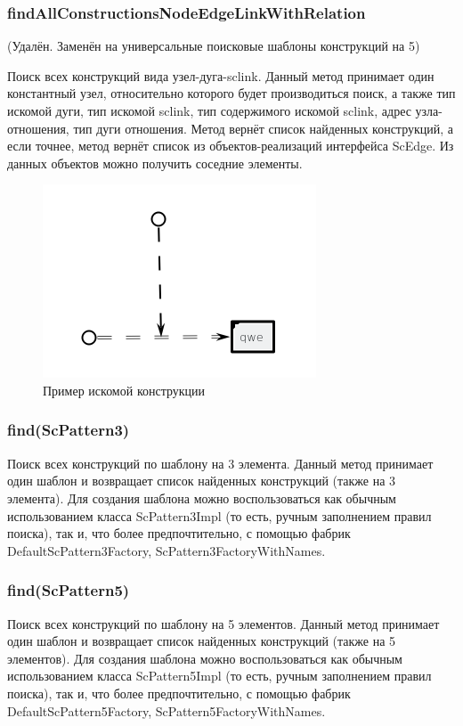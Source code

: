 \subsubsection {findAllConstructionsNodeEdgeLinkWithRelation} (Удалён. Заменён на универсальные поисковые шаблоны конструкций на 5)

Поиск всех конструкций вида узел-дуга-sclink. Данный метод принимает один константный узел, относительно которого будет производиться поиск, а также тип искомой дуги, тип искомой sclink, тип содержимого искомой sclink, адрес узла-отношения, тип дуги отношения. Метод вернёт список найденных конструкций, а если точнее, метод вернёт список из объектов-реализаций интерфейса ScEdge. Из данных объектов можно получить соседние элементы. 
\begin{figure}[H]
    \centering
    \includegraphics{images/sc-context/node-edge-link-with-rel.png}
    \caption{Пример искомой конструкции}
    \label{json_ex}
\end{figure}

\subsubsection{find(ScPattern3)} 

Поиск всех конструкций по шаблону на 3 элемента. Данный метод принимает один шаблон и возвращает список найденных конструкций (также на 3 элемента). Для создания шаблона можно воспользоваться как обычным использованием класса ScPattern3Impl (то есть, ручным заполнением правил поиска), так и, что более предпочтительно, с помощью фабрик DefaultScPattern3Factory, ScPattern3FactoryWithNames. 


\subsubsection{find(ScPattern5)} 

Поиск всех конструкций по шаблону на 5 элементов. Данный метод принимает один шаблон и возвращает список найденных конструкций (также на 5 элементов). Для создания шаблона можно воспользоваться как обычным использованием класса ScPattern5Impl (то есть, ручным заполнением правил поиска), так и, что более предпочтительно, с помощью фабрик DefaultScPattern5Factory, ScPattern5FactoryWithNames. 


